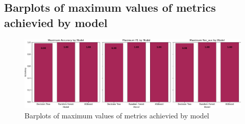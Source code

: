 \documentclass{article}%
\begin{document}
%
\subsection{Barplots of maximum values of metrics achievied by model}%
\label{subsec:Barplotsofmaximumvaluesofmetricsachieviedbymodel}%


\begin{figure}[h!]%
\centering%
\includegraphics[width=460px]{ModelOptimization/barplots_max_metric.png}%
\caption{Barplots of maximum values of metrics achievied by model}%
\end{figure}

%
\end{document}
